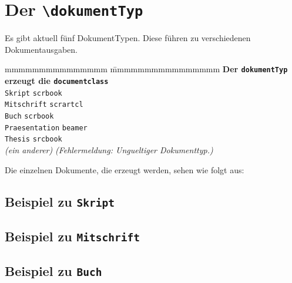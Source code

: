 		\section{Der \texttt{\textbackslash dokumentTyp}}
			Es gibt aktuell fünf DokumentTypen. Diese führen zu verschiedenen Dokumentausgaben.
			\begin{tabbing}
				mmmmmmmmmmmmmmm				\= mmmmmmmmmmmmmmmm					 \kill
				\textbf{Der \texttt{dokumentTyp}\ellipse}
												\> \textbf{\ellipse erzeugt die \texttt{documentclass}} \\
				\texttt{Skript}					\> \texttt{scrbook}\\
				\texttt{Mitschrift}				\> \texttt{scrartcl} \\
				\texttt{Buch}					\> \texttt{scrbook} \\
				\texttt{Praesentation}			\> \texttt{beamer} \\
				\texttt{Thesis}					\> \texttt{srcbook} \\
				\emph{(ein anderer)}		\> \em (Fehlermeldung: Ungueltiger Dokumenttyp.)
			\end{tabbing}
		Die einzelnen Dokumente, die erzeugt werden, sehen wie folgt aus:

		\newpage
		\begin{center}
			\vspace*{20em}
			\subsection{Beispiel zu \texttt{Skript}}
		\end{center}
		\newpage

		\begin{center}
			\vspace*{20em}
			\subsection{Beispiel zu \texttt{Mitschrift}}
		\end{center}
		\newpage

		\begin{center}
			\vspace*{20em}
			\subsection{Beispiel zu \texttt{Buch}}
		\end{center}
		\newpage

